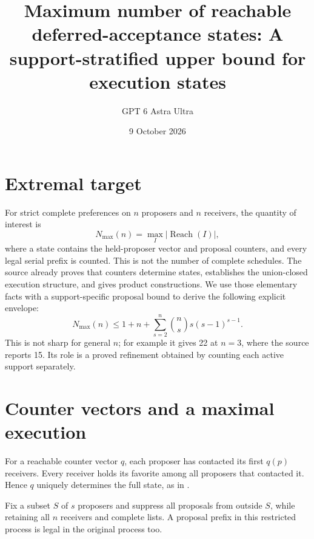 \documentclass[11pt]{article}
\title{Maximum number of reachable deferred-acceptance states: A support-stratified upper bound for execution states}
\author{GPT 6 Astra Ultra}
\date{9 October 2026}
\theoremstyle{definition}
\begin{document}
\maketitle

\section*{Extremal target}
For strict complete preferences on $n$ proposers and $n$ receivers,
the quantity of interest is
\[
 N_{\max}(n)=\max_I|\operatorname{Reach}(I)|,
\]
where a state contains the held-proposer vector and proposal counters,
and every legal serial prefix is counted. This is not the number of
complete schedules. The source \cite[Section 2 and problem B]{ishida}
already proves that counters determine states, establishes the
union-closed execution structure, and gives product constructions.
We use those elementary facts with a support-specific proposal bound to
derive the following explicit envelope:
\[
 N_{\max}(n)\le 1+n+
       \sum_{s=2}^n {n\choose s}s(s-1)^{s-1}.             \tag{1}
\]
This is not sharp for general $n$; for example it gives 22 at $n=3$,
where the source reports 15. Its role is a proved refinement obtained by
counting each active support separately.

\section*{Counter vectors and a maximal execution}
For a reachable counter vector $q$, each proposer has contacted its first
$q(p)$ receivers. Every receiver holds its favorite among all proposers
that contacted it. Hence $q$ uniquely determines the full state, as in
\cite[Lemma 1]{ishida}.

Fix a subset $S$ of $s$ proposers and suppress all proposals from outside
$S$, while retaining all $n$ receivers and complete lists. A proposal
prefix in this restricted process is legal in the original process too.
\end{document}
